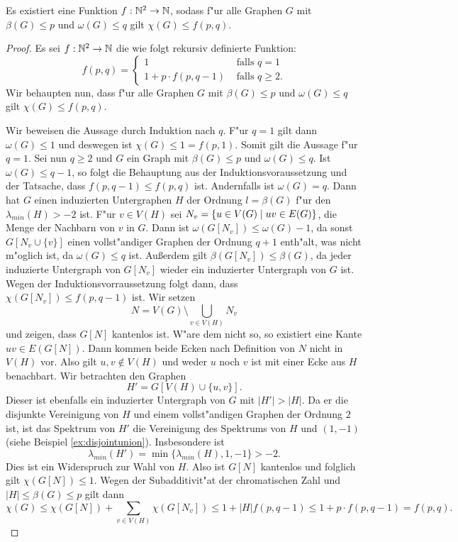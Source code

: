 \begin{theorem}
  Es existiert eine Funktion $f:{\mathbb{N}}^{2} \to {\mathbb{N}}$, sodass f"ur alle Graphen $G$ mit $\beta(G)\leq p$ und $\omega(G) \leq q$ gilt $\chi(G) \leq f(p,q) $. 
  \label{lem:funktionxilemma}
\end{theorem}
\begin{proof}
  Es sei $f:{\mathbb{N}}^{2}\to {\mathbb{N}}$ die wie folgt rekursiv definierte Funktion:
  $$f(p,q) = \begin{cases}
    1 & \text{ falls } q = 1 \\
    1+p\cdot f(p,q-1) & \text{ falls } q \geq 2.
  \end{cases}$$
  Wir behaupten nun, dass f"ur alle Graphen $G$ mit $\beta(G) \leq p$ und $\omega(G)  \leq q$ gilt $\chi(G) \leq f(p,q)$. 

  Wir beweisen die Aussage durch Induktion nach $q$. F"ur $q=1$ gilt dann $\omega(G) \leq  1$ und deswegen ist $\chi(G) \leq 1 = f(p,1)$. Somit gilt die Aussage f"ur $q=1$. 
  Sei nun $q \geq 2$ und $G$ ein Graph mit $\beta(G) \leq p$ und $\omega(G) \leq q$. Ist $\omega(G) \leq q-1$, so folgt die Behauptung aus der Induktionsvoraussetzung und der Tatsache, dass $f(p,q-1) \leq f(p,q)$ ist. 
  Andernfalls ist $\omega(G) = q$.
  Dann hat $G$ einen induzierten Untergraphen $H$ der Ordnung $l=\beta(G)$ f"ur den $\lambda_{min}(H) > -2$ ist. F"ur $v\in V(H)$ sei $N_v = \{u\in V(G) \;|\; uv\in E(G) \}$, die Menge der Nachbarn von
  $v$ in $G$. Dann ist $\omega(G[N_v]) \leq \omega(G) -1 $, da sonst $G[N_v\cup \{v\}]$ einen vollst"andiger Graphen der Ordnung $q+1$ enth"alt, was nicht m"oglich ist, da $\omega(G) \leq q$ ist. Au{\ss}erdem gilt $\beta(G[N_v]) \leq \beta(G)$, da jeder induzierte Untergraph von $G[N_v]$ wieder ein induzierter Untergraph von $G$ ist. Wegen der Induktionsvorraussetzung folgt dann, dass $\chi(G[N_v]) \leq f(p,q-1)$ ist. 
  Wir setzen $$N = V(G) \setminus \bigcup\limits_{v\in V(H)} N_v$$ 
  und zeigen, dass $G[N]$ kantenlos ist. W"are dem nicht so, so existiert eine Kante $uv\in E(G[N])$. 
  Dann kommen beide Ecken nach Definition von $N$ nicht in $V(H)$ vor. 
  Also gilt $u,v\notin V(H)$ und weder $u$ noch $v$ ist mit einer Ecke aus $H$ benachbart. Wir betrachten den Graphen $$H' = G[V(H) \cup \{u,v\}].$$ Dieser ist ebenfalls ein induzierter Untergraph von $G$ mit $|H'| > |H|$. Da er die disjunkte Vereinigung von $H$ und einem vollst"andigen Graphen der Ordnung $2$ ist, ist das Spektrum von $H'$ die Vereinigung des Spektrums von $H$ und $(1,-1)$ (siehe Beispiel \ref{ex:disjointunion}). Insbesondere ist $$\lambda_{min}(H') = \min \{\lambda_{min}(H),1,-1\} > -2.$$ 
  Dies ist ein Widerspruch zur Wahl von $H$. Also ist $G[N]$ kantenlos und folglich gilt $\chi(G[N]) \leq 1$. 
  Wegen der Subadditivit"at der chromatischen Zahl und $|H| \leq \beta(G) \leq p$ gilt dann $$\chi(G) \leq \chi(G[N]) + \sum\limits_{v\in V(H)}\chi(G[N_v]) \leq 1 + |H|f(p,q-1)  \leq 1+p\cdot f(p,q-1)= f(p,q).$$
\end{proof}

